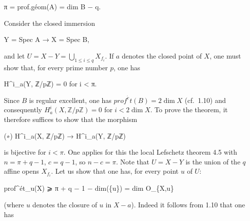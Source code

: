 \documentclass[
  11pt,
  a4paper,
]{book}
\newenvironment{Shaded}{}{}
\newcommand{\NormalTok}[1]{#1}
\begin{document}
\begin{Shaded}
\begin{Highlighting}[]
\NormalTok{π = prof.géom(A) = dim B − q.}
\end{Highlighting}
\end{Shaded}

Consider the closed immersion

\begin{Shaded}
\begin{Highlighting}[]
\NormalTok{Y = Spec A → X = Spec B,}
\end{Highlighting}
\end{Shaded}

and let \(U = X - Y = \bigcup_{1 \leqslant i \leqslant q} X_{f_{i}}\).
If \(a\) denotes the closed point of \(X\), one must show that, for
every prime number \(p\), one has

\begin{Shaded}
\begin{Highlighting}[]
\NormalTok{H\^{}i\_a(Y, ℤ/pℤ) = 0 for i \textless{} π.}
\end{Highlighting}
\end{Shaded}

Since \(B\) is regular excellent, one has
\(prof^{\acute{e}}t(B) = 2 \dim X\) (cf.~1.10) and consequently
\(H^{i}_{a}(X,
\mathbb{Z}/p\mathbb{Z}) = 0\) for \(i < 2 \dim X\). To prove the
theorem, it therefore suffices to show that the morphism

\begin{Shaded}
\begin{Highlighting}[]
\NormalTok{(∗) H\^{}i\_a(X, ℤ/pℤ) → H\^{}i\_a(Y, ℤ/pℤ)}
\end{Highlighting}
\end{Shaded}

is bijective for \(i < \pi\). One applies for this the local Lefschetz
theorem 4.5 with \(n = \pi + q - 1\), \(c = q - 1\), so \(n - c = \pi\).
Note that \(U = X - Y\) is the union of the \(q\) affine opens
\(X_{f_{i}}\). Let us show that one has, for every point \(u\) of \(U\):

\begin{Shaded}
\begin{Highlighting}[]
\NormalTok{prof\^{}ét\_u(X) ⩾ π + q − 1 − dim(\{u\}) = dim O\_\{X,u\}}
\end{Highlighting}
\end{Shaded}

(where \({u}\) denotes the closure of \(u\) in \(X - {a}\)). Indeed it
follows from 1.10 that one has
\end{document}
